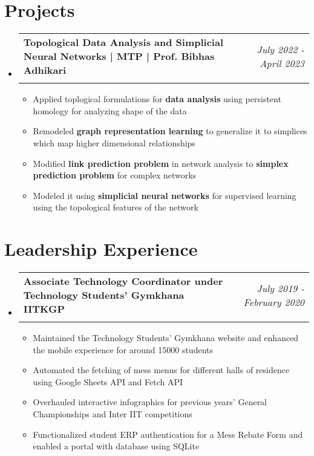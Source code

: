 \documentclass[a4paper,10pt]{article}
\makeatletter
\newcommand{\resumeSubheading}[4]{
\vspace{0.3mm}\item
    \begin{tabular*}{0.98\textwidth}[t]{l@{\extracolsep{\fill}}r}
        \textbf{#1} & \textit{\footnotesize{#4}} \\
        \textit{\textrm{#3}} &  \footnotesize{#2}\\
    \end{tabular*}
    \vspace{-2.0mm}
}
\newcommand{\resumeSubHeadingListStart}{\begin{itemize}[leftmargin=*,labelsep=1mm]}
\newcommand{\resumeItemListStart}{\begin{itemize}[leftmargin=*,labelsep=1mm,itemsep=0.5mm]}
\newcommand{\resumeSubHeadingListEnd}{\end{itemize}\vspace{2mm}}
\newcommand{\resumeItemListEnd}{\end{itemize}\vspace{-2mm}}
\makeatother
\begin{document}
\section{\textbf{Projects}}
\vspace{-0.4mm}
\resumeSubHeadingListStart

\resumeSubheading
{{Topological Data Analysis and Simplicial Neural Networks | MTP | Prof. Bibhas Adhikari}}{}
{}{July 2022 - April 2023}
\vspace{-3mm}
\resumeItemListStart
\item Applied toplogical formulations for \textbf{data analysis} using persistent homology for analyzing shape of the data
\item Remodeled \textbf{graph representation learning} to generalize it to simplices which map higher dimensional relationships
\item Modified \textbf{link prediction problem} in network analysis to \textbf{simplex prediction problem} for complex networks
\item Modeled it using \textbf{simplicial neural networks} for supervised learning using the topological features of the network
\resumeItemListEnd 

\resumeSubHeadingListEnd


\section{\textbf{Leadership Experience}}

\resumeSubHeadingListStart
\resumeSubheading
{Associate Technology Coordinator under Technology Students' Gymkhana IITKGP }{}
{} {July 2019 - February 2020}
\vspace{-3mm}
\resumeItemListStart
\item Maintained the Technology Students' Gymkhana website and enhanced the mobile experience for around 15000 students
\item Automated the fetching of mess menus for different halls of residence using Google Sheets API and Fetch API
\item Overhauled interactive infographics for previous years' General Championships and Inter IIT competitions
\item Functionalized student ERP authentication for a Mess Rebate Form and enabled a portal with database using SQLite
\resumeItemListEnd 


 

\resumeSubHeadingListEnd
\end{document}
